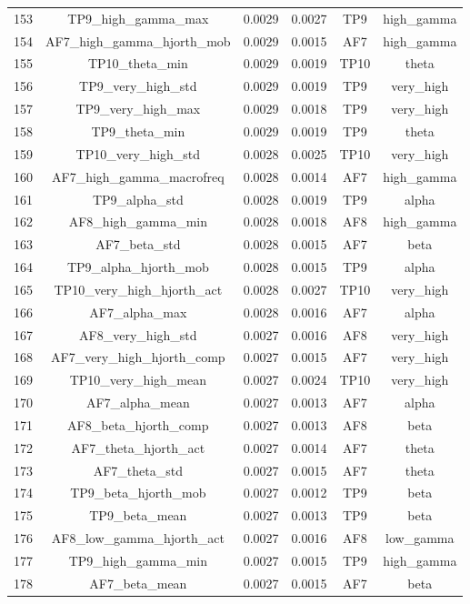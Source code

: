 \begin{table}[hptb]
\begin{table}
\begin{tabular}{cccccc}
153 & TP9_high_gamma_max & 0.0029 & 0.0027 & TP9 & high_gamma \\
154 & AF7_high_gamma_hjorth_mob & 0.0029 & 0.0015 & AF7 & high_gamma \\
155 & TP10_theta_min & 0.0029 & 0.0019 & TP10 & theta \\
156 & TP9_very_high_std & 0.0029 & 0.0019 & TP9 & very_high \\
157 & TP9_very_high_max & 0.0029 & 0.0018 & TP9 & very_high \\
158 & TP9_theta_min & 0.0029 & 0.0019 & TP9 & theta \\
159 & TP10_very_high_std & 0.0028 & 0.0025 & TP10 & very_high \\
160 & AF7_high_gamma_macrofreq & 0.0028 & 0.0014 & AF7 & high_gamma \\
161 & TP9_alpha_std & 0.0028 & 0.0019 & TP9 & alpha \\
162 & AF8_high_gamma_min & 0.0028 & 0.0018 & AF8 & high_gamma \\
163 & AF7_beta_std & 0.0028 & 0.0015 & AF7 & beta \\
164 & TP9_alpha_hjorth_mob & 0.0028 & 0.0015 & TP9 & alpha \\
165 & TP10_very_high_hjorth_act & 0.0028 & 0.0027 & TP10 & very_high \\
166 & AF7_alpha_max & 0.0028 & 0.0016 & AF7 & alpha \\
167 & AF8_very_high_std & 0.0027 & 0.0016 & AF8 & very_high \\
168 & AF7_very_high_hjorth_comp & 0.0027 & 0.0015 & AF7 & very_high \\
169 & TP10_very_high_mean & 0.0027 & 0.0024 & TP10 & very_high \\
170 & AF7_alpha_mean & 0.0027 & 0.0013 & AF7 & alpha \\
171 & AF8_beta_hjorth_comp & 0.0027 & 0.0013 & AF8 & beta \\
172 & AF7_theta_hjorth_act & 0.0027 & 0.0014 & AF7 & theta \\
173 & AF7_theta_std & 0.0027 & 0.0015 & AF7 & theta \\
174 & TP9_beta_hjorth_mob & 0.0027 & 0.0012 & TP9 & beta \\
175 & TP9_beta_mean & 0.0027 & 0.0013 & TP9 & beta \\
176 & AF8_low_gamma_hjorth_act & 0.0027 & 0.0016 & AF8 & low_gamma \\
177 & TP9_high_gamma_min & 0.0027 & 0.0015 & TP9 & high_gamma \\
178 & AF7_beta_mean & 0.0027 & 0.0015 & AF7 & beta \\

\end{tabular}
\end{table}
\end{table}
